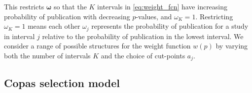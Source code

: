 \documentclass[12pt]{article}   	%
\numberwithin{equation}{section}
\begin{document}
This restricts $\boldsymbol{\omega}$ so that the $K$ intervals in \eqref{eq:weight_fcn} have increasing probability of publication with decreasing $p$-values, and $\omega_K = 1$. Restricting $\omega_K = 1$ means each other $\omega_j$ represents the probability of publication for a study in interval $j$ relative to the probability of publication in the lowest interval. We consider a range of possible structures for the weight function $w(p)$ by varying both the number of intervals $K$ and the choice of cut-points $a_j$.


\subsection{Copas selection model} \label{sec:copas}
\end{document}
